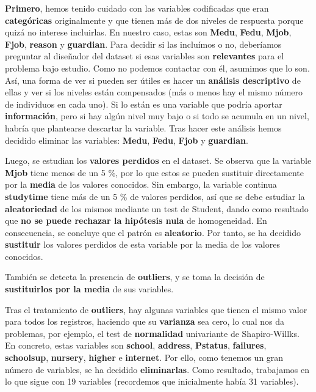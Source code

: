 \documentclass[a4paper, 11pt]{article}
\begin{document}
\textbf{Primero}, hemos tenido cuidado con las variables codificadas que eran \textbf{categóricas} originalmente y que tienen más de dos niveles de respuesta porque quizá no interese incluirlas. En nuestro caso, estas son \textbf{Medu}, \textbf{Fedu}, \textbf{Mjob}, \textbf{Fjob}, \textbf{reason} y \textbf{guardian}. Para decidir si las incluímos o no, deberíamos preguntar al diseñador del dataset si esas variables son \textbf{relevantes} para el problema bajo estudio. Como no podemos contactar con él, asumimos que lo son. Así, una forma de ver si pueden ser útiles es hacer un \textbf{análisis descriptivo} de ellas y ver si los niveles están compensados (más o menos hay el mismo número de individuos en cada uno). Si lo están es una variable que podría aportar \textbf{información}, pero si hay algún nivel muy bajo o si todo se acumula en un nivel, habría que plantearse descartar la variable. Tras hacer este análisis hemos decidido eliminar las variables: \textbf{Medu}, \textbf{Fedu}, \textbf{Fjob} y \textbf{guardian}.

Luego, se estudian los \textbf{valores perdidos} en el dataset. Se observa que la variable \textbf{Mjob} tiene menos de un 5 \%, por lo que estos se pueden sustituir directamente por la \textbf{media} de los valores conocidos. Sin embargo, la variable continua \textbf{studytime} tiene más de un 5 \% de valores perdidos, así que se debe estudiar la \textbf{aleatoriedad} de los mismos mediante un test de Student, dando como resultado que \textbf{no se puede rechazar la hipótesis nula} de homogeneidad. En consecuencia, se concluye que el patrón es \textbf{aleatorio}. Por tanto, se ha decidido \textbf{sustituir} los valores perdidos de esta variable por la media de los valores conocidos.

También se detecta la presencia de \textbf{outliers}, y se toma la decisión de \textbf{sustituirlos por la media} de sus variables.

Tras el tratamiento de \textbf{outliers}, hay algunas variables que tienen el mismo valor para todos los registros, haciendo que su \textbf{varianza} sea cero, lo cual nos da problemas, por ejemplo, el test de \textbf{normalidad} univariante de Shapiro-Willks. En concreto, estas variables son \textbf{school}, \textbf{address}, \textbf{Pstatus}, \textbf{failures}, \textbf{schoolsup}, \textbf{nursery}, \textbf{higher} e \textbf{internet}. Por ello, como tenemos un gran número de variables, se ha decidido \textbf{eliminarlas}. Como resultado, trabajamos en lo que sigue con 19 variables (recordemos que inicialmente había 31 variables).
\end{document}

